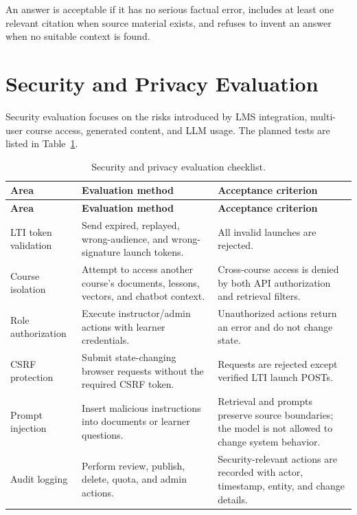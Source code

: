 An answer is acceptable if it has no serious factual error, includes at least
one relevant citation when source material exists, and refuses to invent an
answer when no suitable context is found.

\section{Security and Privacy Evaluation}

Security evaluation focuses on the risks introduced by LMS integration,
multi-user course access, generated content, and LLM usage. The planned tests
are listed in Table~\ref{tab:security-tests}.

\begin{longtable}{|p{3.2cm}|p{5.5cm}|p{4.8cm}|}
    \caption{Security and privacy evaluation checklist.}
    \label{tab:security-tests} \\
    \hline
    \textbf{Area} & \textbf{Evaluation method} & \textbf{Acceptance criterion} \\
    \hline
    \endfirsthead
    \hline
    \textbf{Area} & \textbf{Evaluation method} & \textbf{Acceptance criterion} \\
    \hline
    \endhead

    LTI token validation
        & Send expired, replayed, wrong-audience, and wrong-signature launch
          tokens.
        & All invalid launches are rejected. \\
    \hline

    Course isolation
        & Attempt to access another course's documents, lessons, vectors, and
          chatbot context.
        & Cross-course access is denied by both API authorization and retrieval
          filters. \\
    \hline

    Role authorization
        & Execute instructor/admin actions with learner credentials.
        & Unauthorized actions return an error and do not change state. \\
    \hline

    CSRF protection
        & Submit state-changing browser requests without the required CSRF
          token.
        & Requests are rejected except verified LTI launch POSTs. \\
    \hline

    Prompt injection
        & Insert malicious instructions into documents or learner questions.
        & Retrieval and prompts preserve source boundaries; the model is not
          allowed to change system behavior. \\
    \hline

    Audit logging
        & Perform review, publish, delete, quota, and admin actions.
        & Security-relevant actions are recorded with actor, timestamp, entity,
          and change details. \\
    \hline
\end{longtable}

